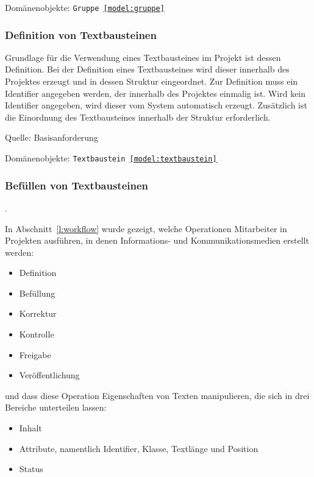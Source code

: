 \textsf{Domänenobjekte:} \texttt{Gruppe \ref{model:gruppe}}

\subsubsection{Definition von Textbausteinen}\label{anforderung:definition-textbaustein}

Grundlage für die Verwendung eines Textbausteines im Projekt ist dessen Definition. Bei der Definition eines Textbausteines wird dieser innerhalb des Projektes erzeugt und in dessen Struktur eingeordnet. Zur Definition muss ein Identifier angegeben werden, der innerhalb des Projektes einmalig ist. Wird kein Identifier angegeben, wird dieser vom System automatisch erzeugt. Zusätzlich ist die Einordnung des Textbausteines innerhalb der Struktur erforderlich.

\textsf{Quelle:} Basisanforderung

\textsf{Domänenobjekte:} \texttt{Textbaustein \ref{model:textbaustein}}

\subsubsection{Befüllen von Textbausteinen}\label{anforderung:befüllen-textbaustein}.

\begin{samepage}
In Abschnitt~\ref{l:workflow} wurde gezeigt, welche Operationen Mitarbeiter in Projekten ausführen, in denen Informations- und Kommunikationsmedien erstellt werden:

\begin{itemize}\itemsep -5pt
\item Definition
\item Befüllung
\item Korrektur
\item Kontrolle
\item Freigabe
\item Veröffentlichung
\end{itemize}
\end{samepage}

\begin{samepage}
und dass diese Operation Eigenschaften von Texten manipulieren, die sich in drei Bereiche unterteilen lassen:

\begin{itemize}\itemsep -5pt
\item Inhalt
\item Attribute, namentlich Identifier, Klasse, Textlänge und Position
\item Status
\end{itemize}
\end{samepage}

